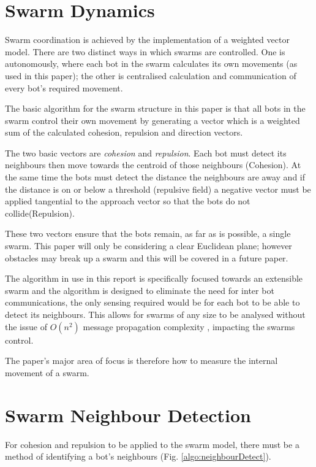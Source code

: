\documentclass[10pt,journal,letterpaper,twoside]{IEEEtran}
\newcommand{\stability}{internal movement}
\begin{document}
\section{Swarm Dynamics\label{section:swarmDynamics}}

Swarm coordination is achieved by the implementation of a weighted vector model. There are two distinct ways in which swarms
are controlled. One is autonomously, where each bot in the swarm
calculates its own movements (as used in this paper); the other is centralised calculation and communication of every bot's required movement.

The basic algorithm for the swarm structure in this paper is that all
bots in the swarm control their own movement by generating a vector which is a weighted sum of the calculated cohesion, repulsion and direction vectors.

The two basic vectors are \emph{cohesion} and \emph{repulsion}. Each
bot must detect its neighbours then move towards the centroid of those
neighbours (Cohesion). At the same time the bots must detect the
distance the neighbours are away and if the distance is on or below a
threshold (repulsive field) a negative vector must be applied
tangential to the approach vector so that the bots do not
collide(Repulsion).

These two vectors ensure that the bots remain, as far as is possible,
a single swarm. This paper will only be considering a clear Euclidean
plane; however obstacles may break up a swarm and this will be covered
in a future paper.

The algorithm in use in this report is specifically focused towards an
extensible swarm and the algorithm is designed to eliminate the need
for inter bot communications, the only sensing required would be for
each bot to be able to detect its neighbours. This allows for swarms
of any size to be analysed without the issue of $O(n^2)$ message
propagation complexity \cite{PADZMAKC09}, \cite{MJ08} impacting the
swarms control.

The paper's major area of focus is therefore how to measure the \stability{} of a swarm.

\section{Swarm Neighbour Detection\label{section:swarmNeighbourDetection}}

For cohesion and repulsion to be applied to the swarm model, there
must be a method of identifying a bot's neighbours
(Fig. \ref{algo:neighbourDetect}).
\end{document}
